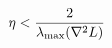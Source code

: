 \documentclass[preview]{standalone}
\begin{document}
\begin{align*}
\special{dvisvgm:raw <g id='unique000'>}\eta < \frac{2}{\lambda_{\max}(\nabla^2 L)}\special{dvisvgm:raw </g>}
\end{align*}
\end{document}
